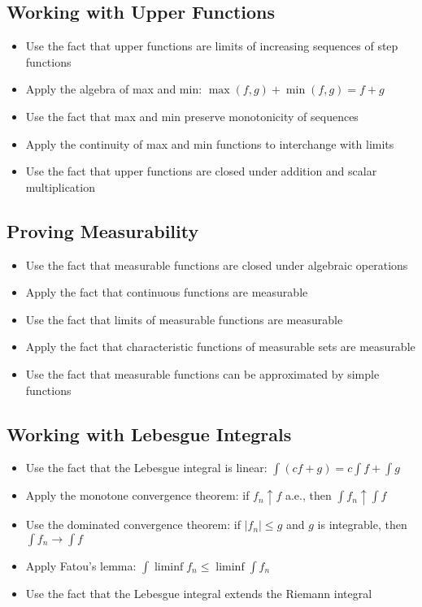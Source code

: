 \subsection*{Working with Upper Functions}
\begin{itemize}
\item Use the fact that upper functions are limits of increasing sequences of step functions
\item Apply the algebra of max and min: $\max(f,g) + \min(f,g) = f + g$
\item Use the fact that max and min preserve monotonicity of sequences
\item Apply the continuity of max and min functions to interchange with limits
\item Use the fact that upper functions are closed under addition and scalar multiplication
\end{itemize}

\subsection*{Proving Measurability}
\begin{itemize}
\item Use the fact that measurable functions are closed under algebraic operations
\item Apply the fact that continuous functions are measurable
\item Use the fact that limits of measurable functions are measurable
\item Apply the fact that characteristic functions of measurable sets are measurable
\item Use the fact that measurable functions can be approximated by simple functions
\end{itemize}

\subsection*{Working with Lebesgue Integrals}
\begin{itemize}
\item Use the fact that the Lebesgue integral is linear: $\int(cf + g) = c\int f + \int g$
\item Apply the monotone convergence theorem: if $f_n \uparrow f$ a.e., then $\int f_n \uparrow \int f$
\item Use the dominated convergence theorem: if $|f_n| \leq g$ and $g$ is integrable, then $\int f_n \to \int f$
\item Apply Fatou's lemma: $\int \liminf f_n \leq \liminf \int f_n$
\item Use the fact that the Lebesgue integral extends the Riemann integral
\end{itemize}

